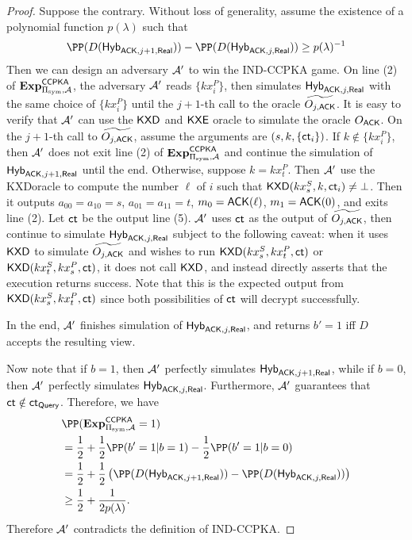 \begin{proof}
    Suppose the contrary. Without loss of generality, assume the existence of a polynomial function $p(\lambda)$ such that
    $$\PP(D(\Hyb_{\ACK, j + 1, \Real})) - \PP(D(\Hyb_{\ACK, j, \Real})) \geq p(\lambda)^{-1}$$
    Then we can design an adversary $\mathcal{A}'$ to win the IND-CCPKA game. On line (2) of $\mathbf{Exp}^{\mathsf{CCPKA}}_{\Pi_{\text{sym}}, \mathcal{A}}$, the adversary $\mathcal{A}'$ reads $\{kx_i^P\}$, then simulates $\mathsf{Hyb}_{\mathsf{ACK}, j, \mathsf{Real}}$ with the same choice of $\{kx_i^P\}$ until the $j + 1$-th call to the oracle $\widetilde{O_{j, \mathsf{ACK}}}$. It is easy to verify that $\mathcal{A}'$ can use the $\mathsf{KXD}$ and $\mathsf{KXE}$ oracle to simulate the oracle $O_{\mathsf{ACK}}$. On the $j + 1$-th call to $\widetilde{O_{j, \mathsf{ACK}}}$, assume the arguments are $(s, k, \{\mathsf{ct}_i\})$. If $k\notin \{kx_i^P\}$, then $\mathcal{A}'$ does not exit line (2) of $\mathbf{Exp}^{\mathsf{CCPKA}}_{\Pi_{\text{sym}}, \mathcal{A}}$ and continue the simulation of $\mathsf{Hyb}_{\mathsf{ACK}, j + 1, \mathsf{Real}}$ until the end. Otherwise, suppose $k = kx_{t}^P$. Then $\mathcal{A}'$ use the KXDoracle to compute the number $\ell$ of $i$ such that $\mathsf{KXD}(kx_s^S, k, \mathsf{ct}_i) \neq \bot$. Then it outputs $a_{00} = a_{10} = s$, $a_{01} = a_{11} = t$, $m_0 = \mathsf{ACK}(\ell)$, $m_1 = \mathsf{ACK}(0)$, and exits line (2). Let $\mathsf{ct}$ be the output line (5). $\mathcal{A}'$ uses $\mathsf{ct}$ as the output of $\widetilde{O_{j, \mathsf{ACK}}}$, then continue to simulate $\mathsf{Hyb}_{\mathsf{ACK}, j, \mathsf{Real}}$ subject to the following caveat: when it uses $\mathsf{KXD}$ to simulate $\widetilde{O_{j, \mathsf{ACK}}}$ and wishes to run $\mathsf{KXD}(kx_s^S, kx_t^P, \mathsf{ct})$ or $\mathsf{KXD}(kx_t^S, kx_s^P, \mathsf{ct})$, it does not call $\mathsf{KXD}$, and instead directly asserts that the execution returns success. Note that this is the expected output from $\mathsf{KXD}(kx_s^S, kx_t^P, \mathsf{ct})$ since both possibilities of $\mathsf{ct}$ will decrypt successfully. 

    In the end, $\mathcal{A}'$ finishes simulation of $\mathsf{Hyb}_{\mathsf{ACK}, j, \mathsf{Real}}$, and returns $b' = 1$ iff $D$ accepts the resulting view.

    Now note that if $b = 1$, then $\mathcal{A}'$ perfectly simulates $\mathsf{Hyb}_{\mathsf{ACK}, j + 1, \mathsf{Real}}$, while if $b = 0$, then $\mathcal{A}'$ perfectly simulates $\mathsf{Hyb}_{\mathsf{ACK}, j, \mathsf{Real}}$. Furthermore, $\mathcal{A}'$ guarantees that $\mathsf{ct} \notin \mathsf{ct}_{\mathsf{Query}}$. Therefore, we have
    \begin{align*}
     &\PP(\mathbf{Exp}^{\mathsf{CCPKA}}_{\Pi_{\sym}, \cA} = 1) \\
     &= \frac{1}{2} + \frac{1}{2}\PP(b' = 1 | b = 1) - \frac{1}{2}\PP(b' = 1 | b = 0) \\   
     &= \frac{1}{2} + \frac{1}{2}\left(\PP(D(\Hyb_{\ACK, j + 1, \Real})) - \PP(D(\Hyb_{\ACK, j, \Real}))\right) \\
     &\geq \frac{1}{2} + \frac{1}{2p(\lambda)}.
    \end{align*}
    Therefore $\mathcal{A}'$ contradicts the definition of IND-CCPKA.
\end{proof}

